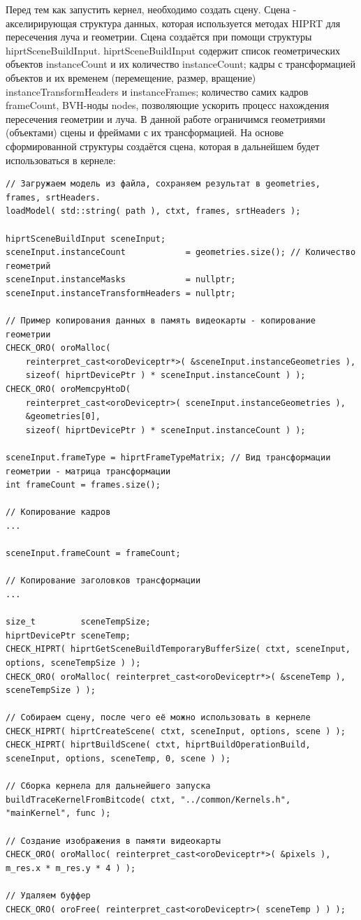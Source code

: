 \documentclass[a4paper,14pt]{extarticle}
\begin{document}
Перед тем как запустить кернел, необходимо создать сцену. Сцена - акселирирующая структура данных, которая используется
методах HIPRT для пересечения луча и геометрии. Сцена создаётся при помощи структуры hiprtSceneBuildInput.
hiprtSceneBuildInput содержит список геометрических объектов instanceCount и их количество instanceCount; 
кадры с трансформацией объектов и их временем (перемещение, размер, вращение) instanceTransformHeaders и instanceFrames; 
количество самих кадров frameCount, BVH-ноды nodes, позволяющие ускорить процесс нахождения пересечения геометрии и луча. 
В данной работе ограничимся геометриями (объектами) сцены и фреймами с их трансформацией. На основе сформированной структуры 
создаётся сцена, которая в дальнейшем будет использоваться в кернеле:
\begin{verbatim}
// Загружаем модель из файла, сохраняем результат в geometries, frames, srtHeaders.
loadModel( std::string( path ), ctxt, frames, srtHeaders );

hiprtSceneBuildInput sceneInput;
sceneInput.instanceCount			= geometries.size(); // Количество геометрий
sceneInput.instanceMasks			= nullptr;
sceneInput.instanceTransformHeaders = nullptr;

// Пример копирования данных в память видеокарты - копирование геометрии
CHECK_ORO( oroMalloc(                                   
    reinterpret_cast<oroDeviceptr*>( &sceneInput.instanceGeometries ),
    sizeof( hiprtDevicePtr ) * sceneInput.instanceCount ) );
CHECK_ORO( oroMemcpyHtoD(
    reinterpret_cast<oroDeviceptr>( sceneInput.instanceGeometries ),
    &geometries[0],
    sizeof( hiprtDevicePtr ) * sceneInput.instanceCount ) );

sceneInput.frameType = hiprtFrameTypeMatrix; // Вид трансформации геометрии - матрица трансформации
int frameCount = frames.size();

// Копирование кадров
...

sceneInput.frameCount = frameCount;

// Копирование заголовков трансформации
...

size_t		   sceneTempSize;
hiprtDevicePtr sceneTemp;
CHECK_HIPRT( hiprtGetSceneBuildTemporaryBufferSize( ctxt, sceneInput, options, sceneTempSize ) );
CHECK_ORO( oroMalloc( reinterpret_cast<oroDeviceptr*>( &sceneTemp ), sceneTempSize ) );

// Собираем сцену, после чего её можно использовать в кернеле
CHECK_HIPRT( hiprtCreateScene( ctxt, sceneInput, options, scene ) );
CHECK_HIPRT( hiprtBuildScene( ctxt, hiprtBuildOperationBuild, sceneInput, options, sceneTemp, 0, scene ) );

// Сборка кернела для дальнейшего запуска
buildTraceKernelFromBitcode( ctxt, "../common/Kernels.h", "mainKernel", func );

// Создание изображения в памяти видеокарты
CHECK_ORO( oroMalloc( reinterpret_cast<oroDeviceptr*>( &pixels ), m_res.x * m_res.y * 4 ) );

// Удаляем буффер
CHECK_ORO( oroFree( reinterpret_cast<oroDeviceptr>( sceneTemp ) ) );
\end{verbatim}
\end{document}

